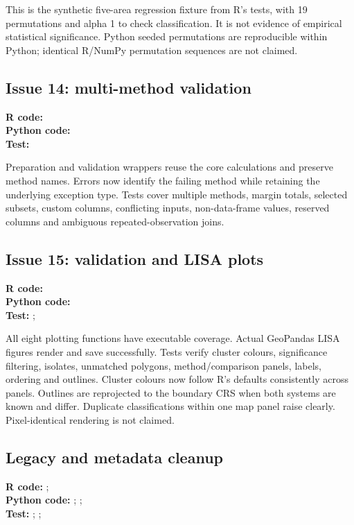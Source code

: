 \documentclass[10pt]{article}
\begin{document}
This is the synthetic five-area regression fixture from R's tests, with
19 permutations and alpha 1 to check classification. It is not evidence of
empirical statistical significance. Python seeded permutations are reproducible
within Python; identical R/NumPy permutation sequences are not claimed.

\subsection{Issue 14: multi-method validation}
{\footnotesize \textbf{R code:} \\ \textbf{Python code:} \\ \textbf{Test:} \par}


Preparation and validation wrappers reuse the core calculations and preserve
method names. Errors now identify the failing method while retaining the
underlying exception type. Tests cover multiple methods, margin totals, selected
subsets, custom columns, conflicting inputs, non-data-frame values, reserved
columns and ambiguous repeated-observation joins.

\subsection{Issue 15: validation and LISA plots}
{\footnotesize \textbf{R code:} \\ \textbf{Python code:} \\ \textbf{Test:} ; \par}


All eight plotting functions have executable coverage. Actual GeoPandas LISA
figures render and save successfully. Tests verify cluster colours, significance
filtering, isolates, unmatched polygons, method/comparison panels, labels,
ordering and outlines. Cluster colours now follow R's defaults consistently
across panels. Outlines are reprojected to the boundary CRS when both systems
are known and differ. Duplicate classifications within one map panel raise
clearly. Pixel-identical rendering is not claimed.

\subsection{Legacy and metadata cleanup}
{\footnotesize \textbf{R code:} ; \\ \textbf{Python code:} ; ; \\ \textbf{Test:} ; ; \par}
\end{document}
